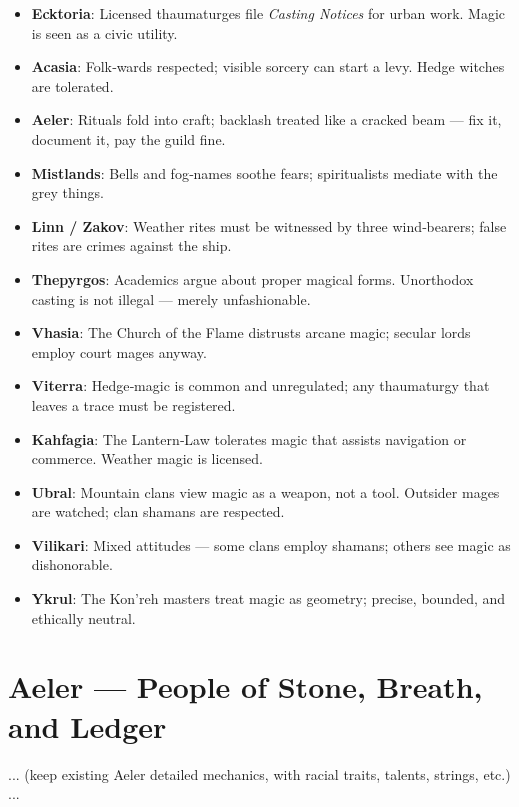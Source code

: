 \begin{itemize}
\item \textbf{Ecktoria}: Licensed thaumaturges file \emph{Casting Notices} for urban work. Magic is seen as a civic utility.
\item \textbf{Acasia}: Folk‑wards respected; visible sorcery can start a levy. Hedge witches are tolerated.
\item \textbf{Aeler}: Rituals fold into craft; backlash treated like a cracked beam — fix it, document it, pay the guild fine.
\item \textbf{Mistlands}: Bells and fog‑names soothe fears; spiritualists mediate with the grey things.
\item \textbf{Linn / Zakov}: Weather rites must be witnessed by three wind‑bearers; false rites are crimes against the ship.
\item \textbf{Thepyrgos}: Academics argue about proper magical forms. Unorthodox casting is not illegal — merely unfashionable.
\item \textbf{Vhasia}: The Church of the Flame distrusts arcane magic; secular lords employ court mages anyway.
\item \textbf{Viterra}: Hedge‑magic is common and unregulated; any thaumaturgy that leaves a trace must be registered.
\item \textbf{Kahfagia}: The Lantern‑Law tolerates magic that assists navigation or commerce. Weather magic is licensed.
\item \textbf{Ubral}: Mountain clans view magic as a weapon, not a tool. Outsider mages are watched; clan shamans are respected.
\item \textbf{Vilikari}: Mixed attitudes — some clans employ shamans; others see magic as dishonorable.
\item \textbf{Ykrul}: The Kon'reh masters treat magic as geometry; precise, bounded, and ethically neutral.
\end{itemize}

\clearpage


\section{Aeler — People of Stone, Breath, and Ledger}
\label{sec:aeler-detailed}
... (keep existing Aeler detailed mechanics, with racial traits, talents, strings, etc.) ...

